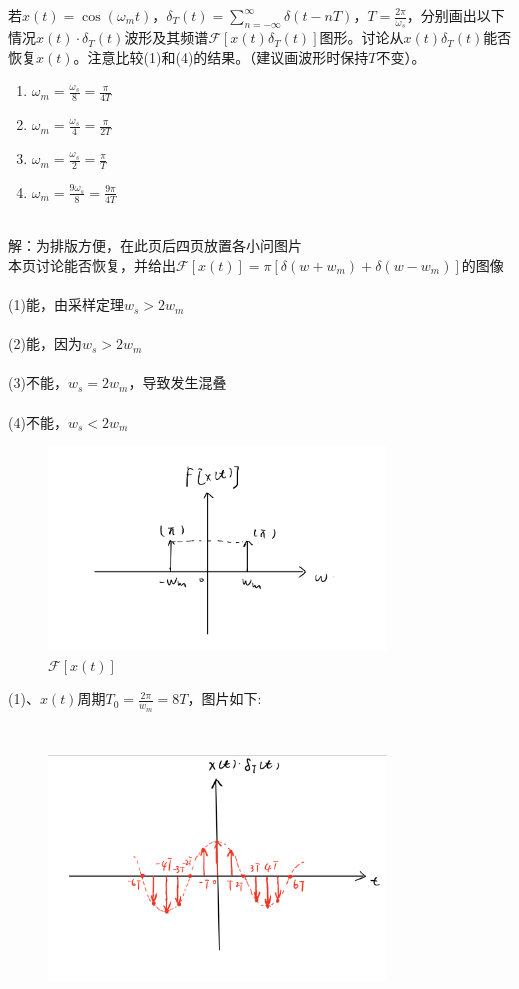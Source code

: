 \documentclass[answers]{exam}
\begin{document}
\begin{questions}
\newpage
\question 若$x(t)=\cos(\omega_{m}t)$，$\delta_{T}(t)=\sum_{n=-\infty}^{\infty}\delta(t-nT)$，$T=\frac{2\pi}{\omega_{s}}$，分别画出以下情况$x(t)\cdot\delta_{T}(t)$波形及其频谱$\mathcal{F}[x(t)\delta_{T}(t)]$图形。讨论从$x(t)\delta_{T}(t)$能否恢复$x(t)$。注意比较(1)和(4)的结果。（建议画波形时保持$T$不变）。
\begin{enumerate}[(1)]
\item $\omega_{m}=\frac{\omega_{s}}{8}=\frac{\pi}{4T}$
\item $\omega_{m}=\frac{\omega_{s}}{4}=\frac{\pi}{2T}$
\item $\omega_{m}=\frac{\omega_{s}}{2}=\frac{\pi}{T}$
\item $\omega_{m}=\frac{9\omega_{s}}{8}=\frac{9\pi}{4T}$
\end{enumerate}
~\\
解：为排版方便，在此页后四页放置各小问图片\\
本页讨论能否恢复，并给出$\mathcal{F}[x(t)]=\pi[\delta(w+w_m)+\delta(w-w_m)]$的图像\\
~\\
(1)能，由采样定理$w_s>2w_m$\\
~\\
(2)能，因为$w_s>2w_m$\\
~\\
(3)不能，$w_s=2w_m$，导致发生混叠\\
~\\
(4)不能，$w_s<2w_m$\\
\begin{figure}[h]
	\centering
	\includegraphics[width=0.8\textwidth]{pics/p2-0.PNG}
	\caption{$\mathcal{F}[x(t)]$}
\end{figure}
\newpage
(1)、$x(t)$周期$T_0=\frac{2\pi}{w_m}=8T$，图片如下:\\
\begin{figure}[h]
	\centering
	\includegraphics[width=0.8\textwidth,height=7.5cm]{pics/p2-1-1.PNG}

\end{figure}
\end{questions}
\end{document}
